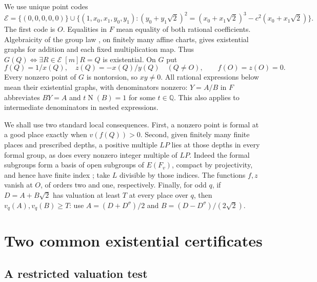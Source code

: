 \documentclass[11pt]{article}
\theoremstyle{definition}\newtheorem{inputthm}[theorem]{Hypothesis}
\theoremstyle{remark}\newtheorem{remark}[theorem]{Remark}
\newcommand{\Q}{\mathbb Q}\newcommand{\Z}{\mathbb Z}
\newcommand{\Nm}{\operatorname{N}}\newcommand{\hhat}{\widehat h}
\begin{document}
We use unique point codes
\[
 \mathscr E=\{(0,0,0,0,0)\}\cup
 \{(1,x_0,x_1,y_0,y_1):
 (y_0+y_1\sqrt2)^2=(x_0+x_1\sqrt2)^3-c^2(x_0+x_1\sqrt2)\}.
\]
The first code is $O$. Equalities in $F$ mean equality of both rational
coefficients. Algebraicity of the group law
\cite[Theorem~III.3.6]{Silverman}, on finitely many affine charts,
gives existential graphs for addition and each fixed multiplication map.
Thus $G(Q)\iff\exists R\in\mathscr E\;[m]R=Q$ is existential.
On $G$ put
\[
 f(Q)=1/x(Q),\quad z(Q)=-x(Q)/y(Q)\quad(Q\ne O),
 \qquad f(O)=z(O)=0.
\]
Every nonzero point of $G$ is nontorsion, so $xy\ne0$. All rational
expressions below mean their existential graphs, with denominators
nonzero: $Y=A/B$ in $F$ abbreviates $BY=A$ and
$t\Nm(B)=1$ for some $t\in\Q$. This also applies to intermediate
denominators in nested expressions.

We shall use two standard local consequences. First, a nonzero point
is formal at a good place exactly when $v(f(Q))>0$. Second, given
finitely many finite places and prescribed depths, a positive multiple
$LP$ lies at those depths in every formal group, as does every nonzero
integer multiple of $LP$. Indeed the formal subgroups form a basis
of open subgroups of $E(F_v)$, compact by projectivity, and hence have finite
index \cite[Proposition~VII.2.2 and Theorem~IV.6.4]{Silverman}; take
$L$ divisible by those indices. The functions $f,z$ vanish at $O$,
of orders two and one, respectively. Finally, for odd $q$, if
$D=A+B\sqrt2$ has valuation at least $T$ at every place over $q$,
then $v_q(A),v_q(B)\ge T$: use
$A=(D+D^\sigma)/2$ and $B=(D-D^\sigma)/(2\sqrt2)$.

\section{Two common existential certificates}\label{sec:certificates}

\subsection{A restricted valuation test}
\end{document}
